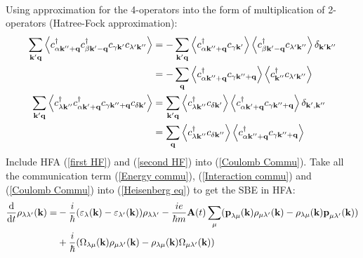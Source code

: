 \documentclass[12pt,english,a4paper]{article}
\newcommand{\dg}{\dagger}
\begin{document}
\begin{appendices}
\begin{align}
\end{align}
\quad Using approximation for the 4-operators into the form of multiplication of 2-operators (Hatree-Fock approximation):
\begin{align}
	\sum_{\textbf{k}'\textbf{q}}\ev{c^\dg_{\alpha \textbf{k}''+\textbf{q}} c^\dg_{\beta \textbf{k}'-\textbf{q}} c_{\gamma \textbf{k}'} c_{\lambda' \textbf{k}''}} &= 	-\sum_{\textbf{k}'\textbf{q}} \ev{c^\dg_{\alpha \textbf{k}''+\textbf{q}}c_{\gamma\textbf{k}'}}\ev{c_{\beta \textbf{k}'-\textbf{q}}^\dg c_{\lambda' \textbf{k}''}} \delta_{\textbf{k}'\textbf{k}''}\nonumber\\\label{first HF}
	&= - \sum_{\textbf{q}}\ev{c^\dg_{\alpha \textbf{k}''+\textbf{q}} c_{\gamma \textbf{k}''+\textbf{q}}}\ev{c^\dg_{\textbf{k}''}c_{\lambda'\textbf{k}''}}\\
	\sum_{\textbf{k}'\textbf{q}} \ev{c^\dg_{\lambda \textbf{k}''} c^\dg_{\alpha \textbf{k}'+\textbf{q}}c_{\gamma \textbf{k}''+\textbf{q}}c_{\delta\textbf{k}'}} &= \sum_{\textbf{k}'\textbf{q}}\ev{c_{\lambda\textbf{k}''}^\dg c_{\delta\textbf{k}'}}\ev{c^\dg_{\alpha \textbf{k}'+\textbf{q}} c_{\gamma \textbf{k}''+\textbf{q}}}\delta_{\textbf{k}',\textbf{k}''}\nonumber \\\label{second HF}
	&= \sum_{\textbf{q}}\ev{c_{\lambda\textbf{k}''}^\dg c_{\delta\textbf{k}''}}\ev{c^\dg_{\alpha \textbf{k}''+\textbf{q}} c_{\gamma \textbf{k}''+\textbf{q}}}
\end{align}
\quad Include HFA (\ref{first HF}) and (\ref{second HF}) into (\ref{Coulomb Commu}).
Take all the communication term (\ref{Energy commu}), (\ref{Interaction commu}) and (\ref{Coulomb Commu}) into (\ref{Heisenberg eq}) to get the SBE in HFA:
\begin{align}
	\dv{ }{t}\rho_{\lambda\lambda'}(\textbf{k}) = &- \frac{i}{\hbar} (\varepsilon_\lambda(\textbf{k}) - \varepsilon_{\lambda'} (\textbf{k}))\rho_{\lambda \lambda'} - \frac{ie}{\hbar m} \textbf{A}(t)\sum_{\mu}(\textbf{p}_{\lambda\mu}(\textbf{k})\rho_{\mu \lambda'}(\textbf{k}) - \rho_{\lambda\mu}(\textbf{k})\textbf{p}_{\mu \lambda'}(\textbf{k})) \nonumber \\
	&+ \frac{i}{\hbar}(\Omega_{\lambda \mu}(\textbf{k})\rho_{\mu \lambda'}(\textbf{k}) - \rho_{\lambda\mu}(\textbf{k}) \Omega_{\mu \lambda'} (\textbf{k}))
\end{align}

\end{appendices}
\end{document}
